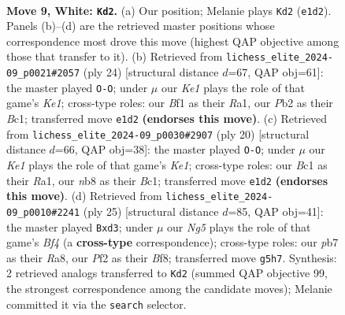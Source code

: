 \documentclass[11pt]{article}
\begin{document}
\begin{figure}[p]\centering
\begin{subfigure}{0.46\textwidth}\centering
\resizebox{\linewidth}{!}{%
\newchessgame
\chessboard[
  setfen={rnbqk1r1/pp2bppp/5n2/3p2N1/3P4/2N5/PP3PPP/R1BQKB1R w KQq - 0 9},
  showmover=false,
  pgfstyle=straightmove, color=movearrow, markmove={e1-d2}
]}
\caption{}
\end{subfigure}\hfill
\begin{subfigure}{0.46\textwidth}\centering
\resizebox{\linewidth}{!}{%
\newchessgame
\chessboard[
  setfen={r1bq1rk1/ppp3pp/5n2/3pb3/8/2PBN3/PP3PPP/R1BQK2R w KQ - 0 13},
  showmover=false,
  pgfstyle=straightmove, color=movearrow, markmove={e1-g1}
]}
\caption{}
\end{subfigure}
\\[4pt]
\begin{subfigure}{0.46\textwidth}\centering
\resizebox{\linewidth}{!}{%
\newchessgame
\chessboard[
  setfen={r2qkb1r/pp1b1ppp/4pn2/8/3N4/2P5/PPB2PPP/R1BQK2R w KQkq - 1 11},
  showmover=false,
  pgfstyle=straightmove, color=movearrow, markmove={e1-g1}
]}
\caption{}
\end{subfigure}\hfill
\begin{subfigure}{0.46\textwidth}\centering
\resizebox{\linewidth}{!}{%
\newchessgame
\chessboard[
  setfen={r3kb1r/pp3ppp/1qn2n2/5b2/8/3P1NP1/PP1BNPBP/R1Q1K2R b KQkq - 0 13},
  showmover=false,
  pgfstyle=straightmove, color=movearrow, markmove={f5-d3}
]}
\caption{}
\end{subfigure}
\caption{\textbf{Move 9, White: \texttt{Kd2}.} (a) Our position; Melanie plays \texttt{Kd2} (\texttt{e1d2}). Panels (b)--(d) are the retrieved master positions whose correspondence most drove this move (highest QAP objective among those that transfer to it). (b) Retrieved from \texttt{lichess\_elite\_2024-09\_p0021\#2057} (ply 24) [structural distance $d$=67, QAP obj=61]: the master played \texttt{O-O}; under $\mu$ our \emph{Ke1} plays the role of that game's \emph{Ke1}; cross-type roles: our \emph{B}f1 as their \emph{R}a1, our \emph{P}b2 as their \emph{B}c1; transferred move \texttt{e1d2} \textbf{(endorses this move)}. (c) Retrieved from \texttt{lichess\_elite\_2024-09\_p0030\#2907} (ply 20) [structural distance $d$=66, QAP obj=38]: the master played \texttt{O-O}; under $\mu$ our \emph{Ke1} plays the role of that game's \emph{Ke1}; cross-type roles: our \emph{B}c1 as their \emph{R}a1, our \emph{n}b8 as their \emph{B}c1; transferred move \texttt{e1d2} \textbf{(endorses this move)}. (d) Retrieved from \texttt{lichess\_elite\_2024-09\_p0010\#2241} (ply 25) [structural distance $d$=85, QAP obj=41]: the master played \texttt{Bxd3}; under $\mu$ our \emph{Ng5} plays the role of that game's \emph{Bf4} (a \textbf{cross-type} correspondence); cross-type roles: our \emph{p}b7 as their \emph{R}a8, our \emph{P}f2 as their \emph{B}f8; transferred move \texttt{g5h7}. Synthesis: 2 retrieved analogs transferred to \texttt{Kd2} (summed QAP objective 99, the strongest correspondence among the candidate moves); Melanie committed it via the \texttt{search} selector.}
\label{fig:thought-m16}
\end{figure}
\end{document}
